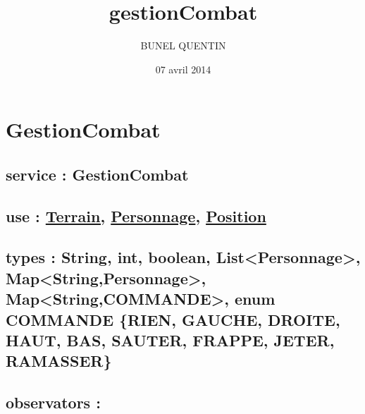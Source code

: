 \documentclass[11pt]{article}
\title{gestionCombat}
\author{BUNEL QUENTIN}
\date{07 avril 2014}
\begin{document}
\maketitle

\setcounter{tocdepth}{3}
\tableofcontents
\vspace*{1cm}
\section{GestionCombat}
\label{sec-1}

\subsection{service : GestionCombat}
\label{sec-1.1}

\subsection{use : \href{file:///users/Etu5/3000675/Desktop/spec/terrain.org}{Terrain,} \href{file:///users/Etu5/3000675/Desktop/spec/personnage.org}{Personnage}, \href{file:///users/Etu5/3000675/Desktop/spec/position.org}{Position}}
\label{sec-1.2}

\subsection{types : String, int, boolean, List<Personnage>, Map<String,Personnage>, Map<String,COMMANDE>, enum COMMANDE \{RIEN, GAUCHE, DROITE, HAUT, BAS, SAUTER, FRAPPE, JETER, RAMASSER\}}
\label{sec-1.3}

  

\subsection{observators :}
\label{sec-1.4}

\subsubsection{}
\end{document}

